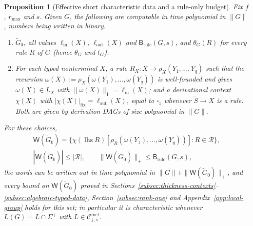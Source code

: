 \documentclass[11pt]{article}
\numberwithin{equation}{section}
\theoremstyle{plain}
\newtheorem{proposition}[theorem]{Proposition}
\theoremstyle{definition}
\theoremstyle{remark}
\newcommand{\Wit}{\mathsf{W}}
\newcommand{\Cmcf}[2]{\mathcal{C}^{\mathrm{mcf}}_{#1,#2}}
\newcommand{\blank}{\square}
\theoremstyle{plain}
\begin{document}
\begin{proposition}[Effective short characteristic data and a rule-only budget]
\label{prop:effective-char-data}
\label{prop:computed-witness-budget}
\label{prop:rule-only-witnesses}
Fix $f$, $r_{\max}$ and $s$.  Given $G$, the following are computable in time
polynomial in $\|G\|$, numbers being written in binary.
\begin{enumerate}[label=\textup{(\roman*)},leftmargin=*]
\item $\widetilde G_0$, all values $\ell_{\mathrm{in}}(X)$, $\ell_{\mathrm{out}}(X)$
and $\mathsf B_{\mathrm{rule}}(G,s)$, and $\theta_G(R)$ for every rule $R$ of $G$ (hence
$\theta_G$ and $t_G$).
\item For each typed nonterminal $X$, a rule $R_X:X\to\rho_X(Y_1,\ldots,Y_q)$ such
that the recursion $\omega(X):=\rho_X(\omega(Y_1),\ldots,\omega(Y_q))$ is
well-founded and gives $\omega(X)\in L_X$ with $\|\omega(X)\|_1=\ell_{\mathrm{in}}(X)$;
and a derivational context $\chi(X)$ with $|\chi(X)|_{\mathrm{fix}}=\ell_{\mathrm{out}}(X)$,
equal to $\blank_1$ whenever $\widetilde S\to X$ is a rule.  Both are given by
derivation DAGs of size polynomial in $\|G\|$.
\end{enumerate}
For these choices,
\[
 \begin{gathered}
 \Wit(\widetilde G_0)=\bigl\{\chi(\operatorname{lhs}R)[\rho_R(\omega(Y_1),\ldots,\omega(Y_q))]:
 R\in\mathcal R\bigr\},\\
 |\Wit(\widetilde G_0)|\le|\mathcal R|,\qquad
 \|\Wit(\widetilde G_0)\|_+\le\mathsf B_{\mathrm{rule}}(G,s),
 \end{gathered}
\]
the words can be written out in time polynomial in
$\|G\|+\|\Wit(\widetilde G_0)\|_+$, and every bound on $\Wit(\widetilde G_0)$ proved in
Sections~\ref{subsec:thickness-contexts}--\ref{subsec:algebraic-typed-data},
Section~\ref{subsec:rank-one} and Appendix~\ref{app:local-group} holds for this set;
in particular it is characteristic whenever $L(G)=L\cap\Sigma^+$ with
$L\in\Cmcf{f}{s}$.
\end{proposition}
\end{document}
